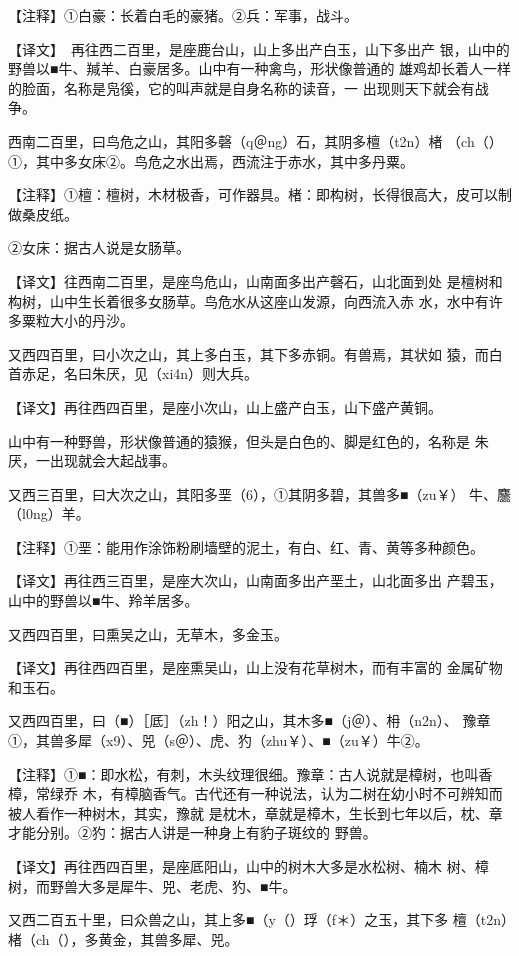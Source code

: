\documentclass[a4paper,12pt,UTF8,twoside]{ctexbook}
\begin{document}
【注释】①白豪：长着白毛的豪猪。②兵：军事，战斗。

【译文】　再往西二百里，是座鹿台山，山上多出产白玉，山下多出产 银，山中的野兽以■牛、羬羊、白豪居多。山中有一种禽鸟，形状像普通的 雄鸡却长着人一样的脸面，名称是凫徯，它的叫声就是自身名称的读音，一 出现则天下就会有战争。

西南二百里，曰鸟危之山，其阳多磬（q＠ng）石，其阴多檀（t2n）楮 （ch（）①，其中多女床②。鸟危之水出焉，西流注于赤水，其中多丹粟。

【注释】①檀：檀树，木材极香，可作器具。楮：即构树，长得很高大，皮可以制做桑皮纸。

②女床：据古人说是女肠草。

【译文】往西南二百里，是座鸟危山，山南面多出产磬石，山北面到处 是檀树和构树，山中生长着很多女肠草。鸟危水从这座山发源，向西流入赤 水，水中有许多粟粒大小的丹沙。

又西四百里，曰小次之山，其上多白玉，其下多赤铜。有兽焉，其状如 猿，而白首赤足，名曰朱厌，见（xi4n）则大兵。

【译文】再往西四百里，是座小次山，山上盛产白玉，山下盛产黄铜。

山中有一种野兽，形状像普通的猿猴，但头是白色的、脚是红色的，名称是 朱厌，一出现就会大起战事。

又西三百里，曰大次之山，其阳多垩（6），①其阴多碧，其兽多■（zu￥） 牛、麢（l0ng）羊。

【注释】①垩：能用作涂饰粉刷墙壁的泥土，有白、红、青、黄等多种颜色。

【译文】再往西三百里，是座大次山，山南面多出产垩土，山北面多出 产碧玉，山中的野兽以■牛、羚羊居多。

又西四百里，曰熏吴之山，无草木，多金玉。

【译文】再往西四百里，是座熏吴山，山上没有花草树木，而有丰富的 金属矿物和玉石。

又西四百里，曰（■）［厎］（zh！）阳之山，其木多■（j＠）、枏（n2n）、 豫章①，其兽多犀（x9）、兕（s＠）、虎、犳（zhu￥）、■（zu￥）牛②。

【注释】①■：即水松，有刺，木头纹理很细。豫章：古人说就是樟树，也叫香樟，常绿乔 木，有樟脑香气。古代还有一种说法，认为二树在幼小时不可辨知而被人看作一种树木，其实，豫就 是枕木，章就是樟木，生长到七年以后，枕、章才能分别。②犳：据古人讲是一种身上有豹子斑纹的 野兽。

【译文】再往西四百里，是座厎阳山，山中的树木大多是水松树、楠木 树、樟树，而野兽大多是犀牛、兕、老虎、犳、■牛。

又西二百五十里，曰众兽之山，其上多■（y（）琈（f＊）之玉，其下多 檀（t2n）楮（ch（），多黄金，其兽多犀、兕。
\end{document}
